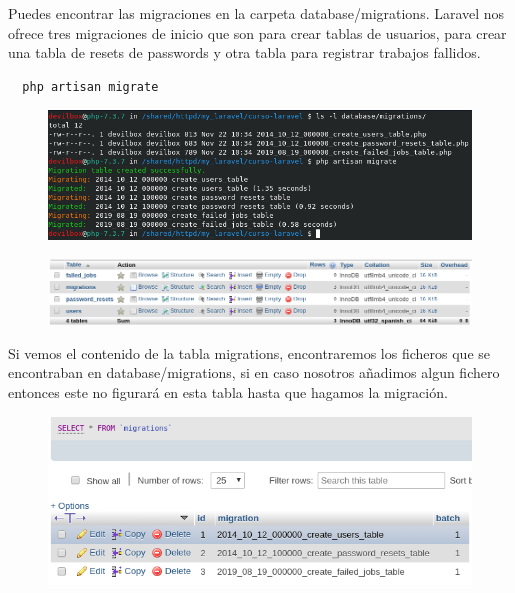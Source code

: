 \documentclass{article}
\begin{document}
Puedes encontrar las migraciones en la carpeta database/migrations. Laravel nos
ofrece tres migraciones de inicio que son para crear tablas de usuarios, para
crear una tabla de resets de passwords y otra tabla para registrar trabajos
fallidos.\\

\begin{verbatim}
  php artisan migrate
\end{verbatim}

\begin{figure}[h!]
  \centering
  \includegraphics[scale=0.5]{./Pictures/023_migrate.png}
\end{figure}

\begin{figure}[h!]
  \centering
  \includegraphics[scale=0.5]{./Pictures/024_migrate.png}
\end{figure}

Si vemos el contenido de la tabla migrations, encontraremos los ficheros que se
encontraban en database/migrations, si en caso nosotros añadimos algun fichero
entonces este no figurará en esta tabla hasta que hagamos la migración.\\

\begin{figure}[h!]
  \centering
  \includegraphics[scale=0.5]{./Pictures/025_table_migrations.png}
\end{figure}
\end{document}
